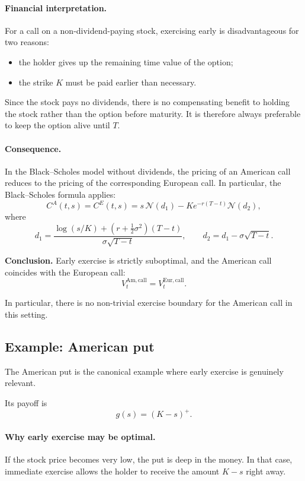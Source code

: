 \documentclass[11pt]{article}
\theoremstyle{definition}
\theoremstyle{plain}
\begin{document}
\paragraph{Financial interpretation.}
For a call on a non-dividend-paying stock, exercising early is
disadvantageous for two reasons:
\begin{itemize}[leftmargin=1.4em]
\item the holder gives up the remaining time value of the option;
\item the strike \(K\) must be paid earlier than necessary.
\end{itemize}
Since the stock pays no dividends, there is no compensating benefit to
holding the stock rather than the option before maturity.
It is therefore always preferable to keep the option alive until \(T\).

\paragraph{Consequence.}
In the Black--Scholes model without dividends, the pricing of an
American call reduces to the pricing of the corresponding European call.
In particular, the Black--Scholes formula applies:
\[
C^A(t,s)=C^E(t,s)
=
s\,\mathcal N(d_1)-K e^{-r(T-t)} \mathcal N(d_2),
\]
where
\[
d_1=
\frac{\log(s/K)+\left(r+\tfrac12\sigma^2\right)(T-t)}
{\sigma\sqrt{T-t}},
\qquad
d_2=d_1-\sigma\sqrt{T-t}.
\]

\textbf{Conclusion.}
Early exercise is strictly suboptimal, and the American call coincides with the European call:
$$
V_t^{\mathrm{Am,call}} = V_t^{\mathrm{Eur,call}}.
$$

In particular, there is no non-trivial exercise boundary for the American call in this setting.

\subsection{Example: American put}

The American put is the canonical example where early exercise is
genuinely relevant.

Its payoff is
\[
g(s)=(K-s)^+.
\]

\paragraph{Why early exercise may be optimal.}
If the stock price becomes very low, the put is deep in the money.
In that case, immediate exercise allows the holder to receive the amount
\(K-s\) right away.
\end{document}
